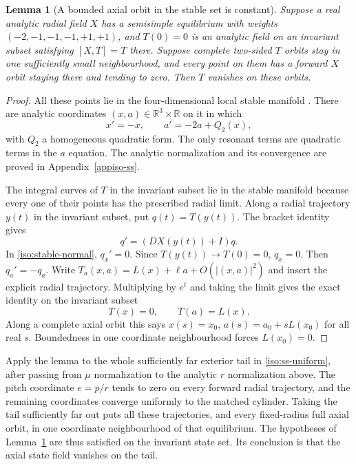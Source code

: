 \documentclass[11pt,a4paper]{article}
\numberwithin{equation}{section}
\theoremstyle{plain}
\newtheorem{lemma}[theorem]{Lemma}
\theoremstyle{definition}
\theoremstyle{remark}
\begin{document}
\begin{lemma}[A bounded axial orbit in the stable set is constant]
\label{iso:stable-axial}
Suppose a real analytic radial field $X$ has a semisimple equilibrium
with weights $(-2,-1,-1,-1,+1,+1)$, and $T(0)=0$ is an analytic field
on an invariant subset satisfying $[X,T]=T$ there.  Suppose complete
two-sided $T$ orbits stay in one sufficiently small neighbourhood, and
every point on them has a forward $X$ orbit staying there and tending
to zero.  Then $T$ vanishes on these orbits.
\end{lemma}
\begin{proof}
All these points lie in the four-dimensional local stable manifold
\cite[Theorem~1.1 and Remark~6]{CabreFontichLlave2003}.
There are analytic coordinates $(x,a)\in\mathbb R^3\times\mathbb R$ on it
in which
\begin{equation}\label{iso:stable-normal}
 x'=-x,\qquad a'=-2a+Q_2(x),
\end{equation}
with $Q_2$ a homogeneous quadratic form. The only resonant terms
are quadratic terms in the $a$ equation. The analytic normalization
and its convergence are proved in Appendix~\ref{appiso-ss}.

The integral curves of $T$ in the invariant subset lie in the stable manifold because every one of
their points has the prescribed radial limit.  Along a radial trajectory $y(t)$ in the invariant subset, put $q(t)=T(y(t))$. The bracket identity gives
\[
 q'=(DX(y(t))+I)q.
\]
In \eqref{iso:stable-normal}, $q_x'=0$.  Since $T(y(t))\to T(0)=0$,
$q_x=0$.  Then $q_a'=-q_a$.
Write $T_a(x,a)=L(x)+\ell a+O(|(x,a)|^2)$ and insert the explicit radial
trajectory.  Multiplying by $e^t$ and taking the limit gives the exact
identity on the invariant subset
\begin{equation}\label{iso:ss-axial-restriction}
 T(x)=0,\qquad T(a)=L(x).
\end{equation}
Along a complete axial orbit this says
$x(s)=x_0$, $a(s)=a_0+sL(x_0)$ for all real $s$.
Boundedness in one coordinate neighbourhood forces $L(x_0)=0$.
\end{proof}

Apply the lemma to the whole sufficiently far exterior tail in
\eqref{iso:ss-uniform}, after passing from $\mu$ normalization to the
analytic $r$ normalization above.  The pitch coordinate $e=p/r$ tends
to zero on every forward radial trajectory, and the remaining
coordinates converge uniformly to the matched cylinder.  Taking the
tail sufficiently far out puts all these trajectories, and every
fixed-radius full axial orbit, in one coordinate neighbourhood of that
equilibrium.  The hypotheses of Lemma~\ref{iso:stable-axial} are thus
satisfied on the invariant state set.  Its conclusion is that the
axial state field vanishes on the tail.
\end{document}
